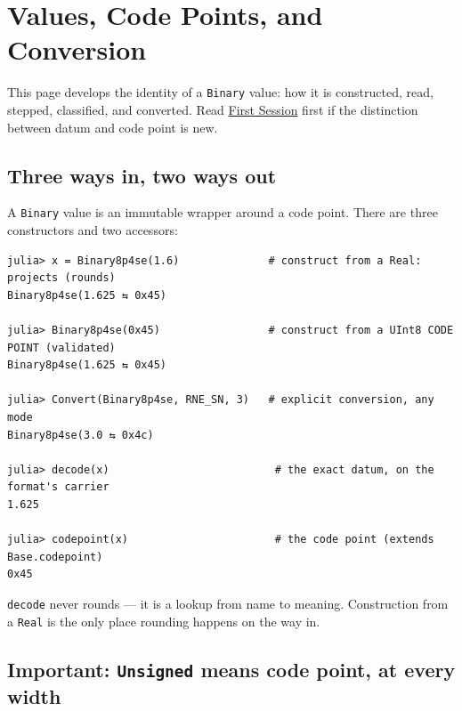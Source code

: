 \section{Values, Code Points, and Conversion}



\label{13665125480892587392}{}


This page develops the identity of a \texttt{Binary} value: how it is constructed, read, stepped, classified, and converted. Read \href{first\_\allowbreak{}session.md}{First Session} first if the distinction between datum and code point is new.



\subsection{Three ways in, two ways out}



\label{18102166844669235044}{}


A \texttt{Binary} value is an immutable wrapper around a code point. There are three constructors and two accessors:




\nopagebreak[4]
\begin{verbatim}
julia> x = Binary8p4se(1.6)              # construct from a Real: projects (rounds)
Binary8p4se(1.625 ⇆ 0x45)

julia> Binary8p4se(0x45)                 # construct from a UInt8 CODE POINT (validated)
Binary8p4se(1.625 ⇆ 0x45)

julia> Convert(Binary8p4se, RNE_SN, 3)   # explicit conversion, any mode
Binary8p4se(3.0 ⇆ 0x4c)

julia> decode(x)                          # the exact datum, on the format's carrier
1.625

julia> codepoint(x)                       # the code point (extends Base.codepoint)
0x45
\end{verbatim}



\texttt{decode} never rounds — it is a lookup from name to meaning. Construction from a \texttt{Real} is the only place rounding happens on the way in.



\subsection{Important: \texttt{Unsigned} means code point, at every width}



